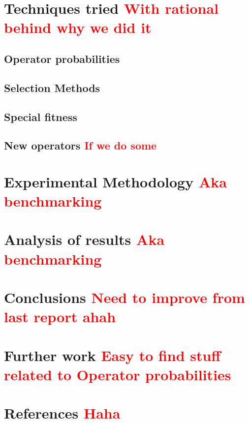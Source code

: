 \documentclass[12pt]{article}
\begin{document}
\section*{Techniques tried \textcolor{red}{With rational behind why we did it}}

\subsection*{Operator probabilities}
\subsection*{Selection Methods}
\subsection*{Special fitness}
\subsection*{New operators \textcolor{red}{If we do some}}

\section*{Experimental Methodology \textcolor{red}{Aka benchmarking}}

\section*{Analysis of results \textcolor{red}{Aka benchmarking}}

\section*{Conclusions \textcolor{red}{Need to improve from last report ahah}}

\section*{Further work \textcolor{red}{Easy to find stuff related to Operator probabilities }}

\section*{References \textcolor{red}{Haha}}
\end{document}
